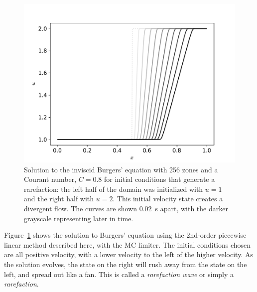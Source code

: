 \begin{figure}[t]
\centering
\includegraphics[width=0.8\linewidth]{fv-burger-rarefaction} 
\caption[Rarefaction solution to the inviscid Burgers'
  equation]{\label{fig:burgers-rarefaction} Solution to the inviscid
  Burgers' equation with 256 zones and a Courant number, $C = 0.8$ for
  initial conditions that generate a rarefaction: the left half of the
  domain was initialized with $u = 1$ and the right half with $u = 2$.
  This initial velocity state creates a divergent flow.  The curves
  are shown 0.02~s apart, with the darker grayscale representing later
  in
  time. \\ }
\end{figure}


Figure~\ref{fig:burgers-rarefaction} shows the solution to Burgers'
equation using the 2nd-order piecewise linear method described here,
with the MC limiter.  The initial conditions chosen are all positive
velocity, with a lower velocity to the left of the higher velocity.
As the solution evolves, the state on the right will rush away from
the state on the left, and spread out like a fan.  This is called a
{\em rarefaction wave} or simply a {\em rarefaction}.

